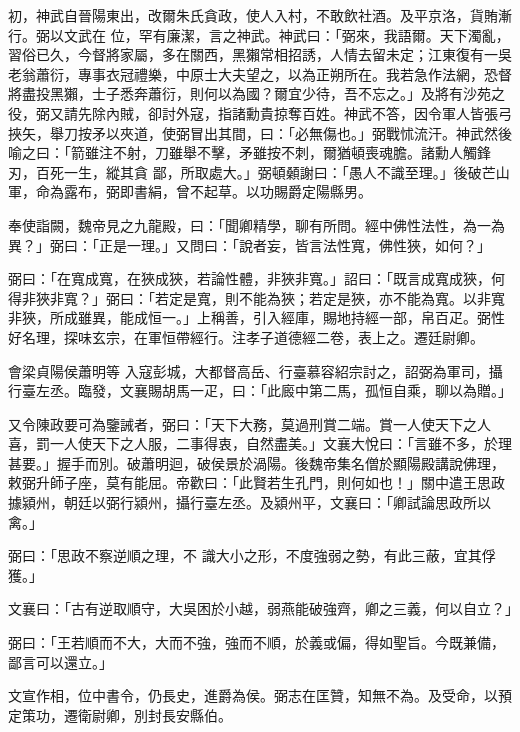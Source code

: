 \begin{pinyinscope}
 初，神武自晉陽東出，改爾朱氏貪政，使人入村，不敢飲社酒。及平京洛，貨賄漸行。弼以文武在
 位，罕有廉潔，言之神武。神武曰：「弼來，我語爾。天下濁亂，習俗已久，今督將家屬，多在關西，黑獺常相招誘，人情去留未定；江東復有一吳老翁蕭衍，專事衣冠禮樂，中原士大夫望之，以為正朔所在。我若急作法網，恐督將盡投黑獺，士子悉奔蕭衍，則何以為國？爾宜少待，吾不忘之。」及將有沙苑之役，弼又請先除內賊，卻討外寇，指諸勳貴掠奪百姓。神武不答，因令軍人皆張弓挾矢，舉刀按矛以夾道，使弼冒出其間，曰：「必無傷也。」弼戰怵流汗。神武然後喻之曰：「箭雖注不射，刀雖舉不擊，矛雖按不刺，爾猶頓喪魂膽。諸勳人觸鋒刃，百死一生，縱其貪
 鄙，所取處大。」弼頓顙謝曰：「愚人不識至理。」後破芒山軍，命為露布，弼即書絹，曾不起草。以功賜爵定陽縣男。



 奉使詣闕，魏帝見之九龍殿，曰：「聞卿精學，聊有所問。經中佛性法性，為一為異？」弼曰：「正是一理。」又問曰：「說者妄，皆言法性寬，佛性狹，如何？」



 弼曰：「在寬成寬，在狹成狹，若論性體，非狹非寬。」詔曰：「既言成寬成狹，何得非狹非寬？」弼曰：「若定是寬，則不能為狹；若定是狹，亦不能為寬。以非寬非狹，所成雖異，能成恒一。」上稱善，引入經庫，賜地持經一部，帛百疋。弼性好名理，探味玄宗，在軍恒帶經行。注孝子道德經二卷，表上之。遷廷尉卿。



 會梁貞陽侯蕭明等
 入寇彭城，大都督高岳、行臺慕容紹宗討之，詔弼為軍司，攝行臺左丞。臨發，文襄賜胡馬一疋，曰：「此廄中第二馬，孤恒自乘，聊以為贈。」



 又令陳政要可為鑒誡者，弼曰：「天下大務，莫過刑賞二端。賞一人使天下之人喜，罰一人使天下之人服，二事得衷，自然盡美。」文襄大悅曰：「言雖不多，於理甚要。」握手而別。破蕭明迴，破侯景於渦陽。後魏帝集名僧於顯陽殿講說佛理，敕弼升師子座，莫有能屈。帝歡曰：「此賢若生孔門，則何如也！」關中遣王思政據潁州，朝廷以弼行潁州，攝行臺左丞。及潁州平，文襄曰：「卿試論思政所以禽。」



 弼曰：「思政不察逆順之理，不
 識大小之形，不度強弱之勢，有此三蔽，宜其俘獲。」



 文襄曰：「古有逆取順守，大吳困於小越，弱燕能破強齊，卿之三義，何以自立？」



 弼曰：「王若順而不大，大而不強，強而不順，於義或偏，得如聖旨。今既兼備，鄙言可以還立。」



 文宣作相，位中書令，仍長史，進爵為侯。弼志在匡贊，知無不為。及受命，以預定策功，遷衛尉卿，別封長安縣伯。




\end{pinyinscope}
